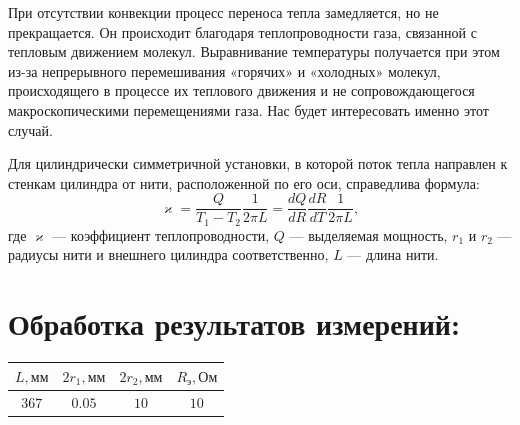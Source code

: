 \documentclass[20pt]{article}
\begin{document}
При отсутствии конвекции процесс переноса тепла замедляется, но не прекращается. Он происходит благодаря теплопроводности газа, связанной с тепловым движением молекул. Выравнивание температуры получается при этом из-за непрерывного перемешивания
«горячих» и «холодных» молекул, происходящего в процессе их теплового движения и не сопровождающегося макроскопическими перемещениями газа. Нас будет интересовать именно этот случай.

Для цилиндрически симметричной установки, в которой поток
тепла направлен к стенкам цилиндра от нити, расположенной по его
оси, справедлива формула:
\[
	\varkappa = \frac{Q}{T_1-T_2} \frac{1}{2\pi L} =  \frac{dQ}{dR} \frac{dR}{dT} \frac{1}{2\pi L},
\]
где $\varkappa$ --- коэффициент теплопроводности, $Q$ --- выделяемая мощность, $r_1$ и $r_2$ --- радиусы нити и внешнего цилиндра соответственно, $L$ --- длина нити.
\section{Обработка результатов измерений:}

\begin{tabular}{|c|c|c|c|}

\hline $L, \text{мм}$ & $2r_1, \text{мм}$ & $2r_2, \text{мм}$ & $R_{\text{э}}, \text{Ом}$ 
\\\hline $367$ & $0.05$ & $10$ & $10$ \\\hline
\end{tabular}
\end{document}
